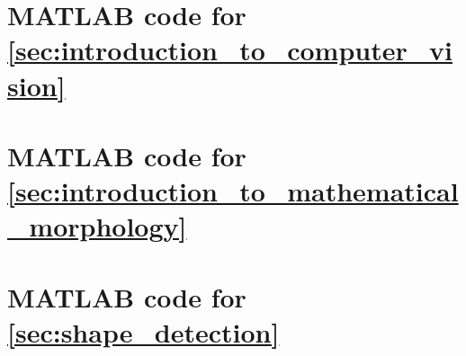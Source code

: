 \begin{appendices}

\section{MATLAB code for \autoref{sec:introduction_to_computer_vision}}
\label{sec:appendix_a}



\newpage
\section{MATLAB code for \autoref{sec:introduction_to_mathematical_morphology}}
\label{sec:appendix_b}



\newpage
\section{MATLAB code for \autoref{sec:shape_detection}}
\label{sec:appendix_c}


\end{appendices}
